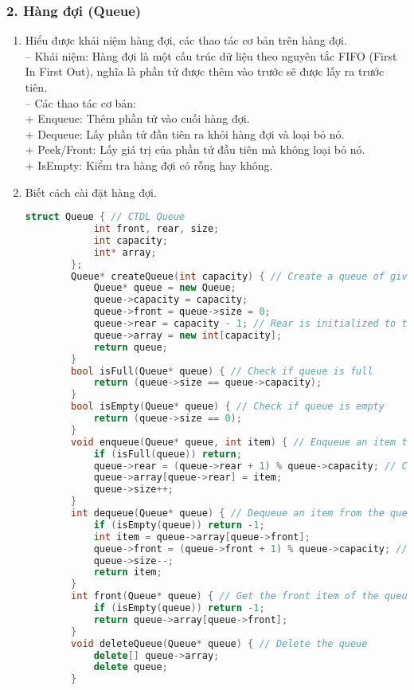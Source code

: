 \subsubsection*{2. Hàng đợi (Queue)}
\begin{enumerate}[label=\alph*.]
    \item Hiểu được khái niệm hàng đợi, các thao tác cơ bản trên hàng đợi.\\
    -- Khái niệm: Hàng đợi là một cấu trúc dữ liệu theo nguyên tắc FIFO (First In First Out), nghĩa là phần tử được thêm vào trước sẽ được lấy ra trước tiên.\\
    -- Các thao tác cơ bản:\\
        + Enqueue: Thêm phần tử vào cuối hàng đợi.\\
        + Dequeue: Lấy phần tử đầu tiên ra khỏi hàng đợi và loại bỏ nó.\\
        + Peek/Front: Lấy giá trị của phần tử đầu tiên mà không loại bỏ nó.\\
        + IsEmpty: Kiểm tra hàng đợi có rỗng hay không.
    \item Biết cách cài đặt hàng đợi.
    \begin{lstlisting}[language=C++]
        struct Queue { // CTDL Queue
            int front, rear, size;
            int capacity;
            int* array;
        };
        Queue* createQueue(int capacity) { // Create a queue of given capacity
            Queue* queue = new Queue;
            queue->capacity = capacity;
            queue->front = queue->size = 0;
            queue->rear = capacity - 1; // Rear is initialized to the last index
            queue->array = new int[capacity];
            return queue;
        }
        bool isFull(Queue* queue) { // Check if queue is full
            return (queue->size == queue->capacity);
        }
        bool isEmpty(Queue* queue) { // Check if queue is empty
            return (queue->size == 0);
        }
        void enqueue(Queue* queue, int item) { // Enqueue an item to the queue
            if (isFull(queue)) return;
            queue->rear = (queue->rear + 1) % queue->capacity; // Circular increment
            queue->array[queue->rear] = item;
            queue->size++;
        }
        int dequeue(Queue* queue) { // Dequeue an item from the queue
            if (isEmpty(queue)) return -1; 
            int item = queue->array[queue->front];
            queue->front = (queue->front + 1) % queue->capacity; // Circular increment
            queue->size--;
            return item;
        }
        int front(Queue* queue) { // Get the front item of the queue
            if (isEmpty(queue)) return -1; 
            return queue->array[queue->front];
        }
        void deleteQueue(Queue* queue) { // Delete the queue
            delete[] queue->array;
            delete queue;
        }
    \end{lstlisting}
\end{enumerate}
